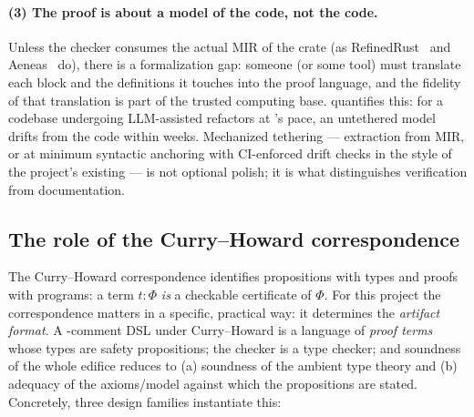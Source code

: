 \paragraph{(3) The proof is about a model of the code, not the code.}
Unless the checker consumes the actual MIR of the crate (as
RefinedRust~\cite{refinedrust2024} and Aeneas~\cite{aeneas2022} do), there
is a formalization gap: someone (or some tool) must translate each
 block and the definitions it touches into the proof
language, and the fidelity of that translation is part of the trusted
computing base.  quantifies this: for a codebase undergoing
LLM-assisted refactors at \dotnetrs{}'s pace, an untethered model drifts
from the code within weeks. Mechanized tethering --- extraction from MIR, or
at minimum syntactic anchoring with CI-enforced drift checks in the style of
the project's existing  --- is not optional
polish; it is what distinguishes verification from documentation.

\subsection{The role of the Curry--Howard correspondence}
\label{sec:theory-ch}

The Curry--Howard correspondence identifies propositions with types and
proofs with programs: a term $t : \Phi$ \emph{is} a checkable certificate of
$\Phi$. For this project the correspondence matters in a specific,
practical way: it determines the \emph{artifact format}. A
\safetyc{}-comment DSL under Curry--Howard is a language of \emph{proof
terms} whose types are safety propositions; the checker is a type checker;
and soundness of the whole edifice reduces to (a) soundness of the ambient
type theory and (b) adequacy of the axioms/model against which the
propositions are stated. Concretely, three design families instantiate
this:

